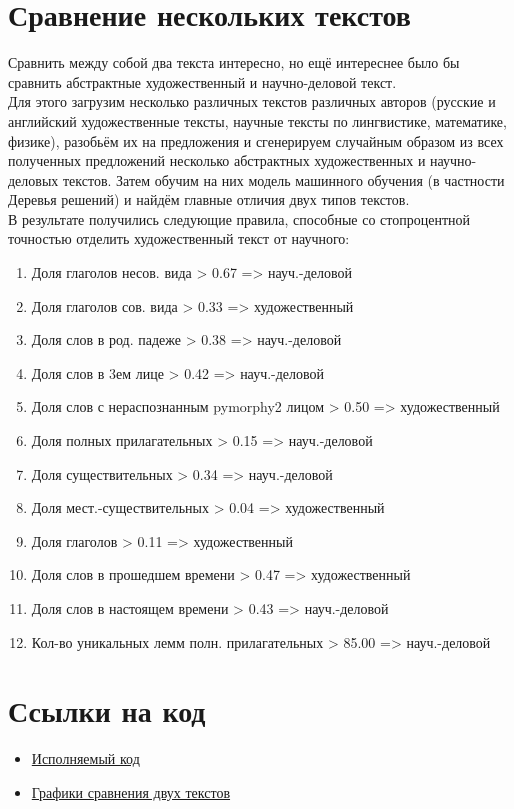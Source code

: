 \documentclass[a4paper,12pt]{article}
\begin{document}
\section{Сравнение нескольких текстов}
Сравнить между собой два текста интересно, но ещё интереснее было бы сравнить абстрактные художественный и научно-деловой текст.\\
Для этого загрузим несколько различных текстов различных авторов (русские и английский художественные тексты, научные тексты по лингвистике, математике, физике), разобьём их на предложения и сгенерируем случайным образом из всех полученных предложений несколько абстрактных художественных и научно-деловых текстов. Затем обучим на них модель машинного обучения (в частности Деревья решений) и найдём главные отличия двух типов текстов.\\
В результате получились следующие правила, способные со стопроцентной точностью отделить художественный текст от научного:
\begin{enumerate}
\item Доля глаголов несов. вида > 0.67 => науч.-деловой
\item Доля глаголов сов. вида > 0.33 => художественный
\item Доля слов в род. падеже > 0.38 => науч.-деловой
\item Доля слов в 3ем лице > 0.42 => науч.-деловой
\item Доля слов с нераспознанным pymorphy2 лицом > 0.50 => художественный
\item Доля полных прилагательных > 0.15 => науч.-деловой
\item Доля существительных > 0.34 => науч.-деловой
\item Доля мест.-существительных > 0.04 => художественный
\item Доля глаголов > 0.11 => художественный
\item Доля слов в прошедшем времени > 0.47 => художественный
\item Доля слов в настоящем времени > 0.43 => науч.-деловой
\item Кол-во уникальных лемм полн. прилагательных > 85.00 => науч.-деловой
\end{enumerate}

\section{Ссылки на код}
\begin{itemize}
\item \href{http://localhost:8888/notebooks/notebooks/hw1/hw1_24.02.2020-Final.ipynb}{Исполняемый код}
\item \href{https://github.com/EgorDudyrev/hse_comp_ling/tree/master/imgs}{Графики сравнения двух текстов}
\end{itemize}
\end{document}
